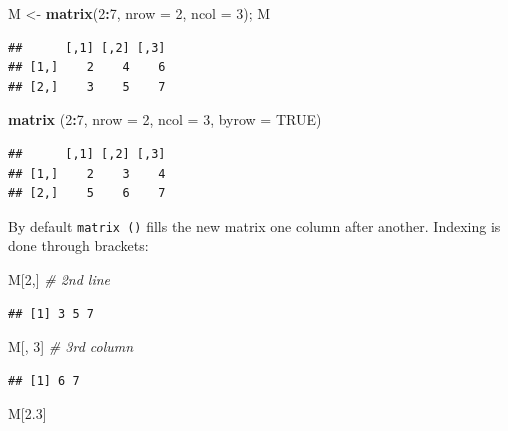 \documentclass[]{book}
\newenvironment{Shaded}{\begin{snugshade}}{\end{snugshade}}
\newcommand{\CommentTok}[1]{\textcolor[rgb]{0.56,0.35,0.01}{\textit{#1}}}
\newcommand{\DataTypeTok}[1]{\textcolor[rgb]{0.13,0.29,0.53}{#1}}
\newcommand{\DecValTok}[1]{\textcolor[rgb]{0.00,0.00,0.81}{#1}}
\newcommand{\FloatTok}[1]{\textcolor[rgb]{0.00,0.00,0.81}{#1}}
\newcommand{\KeywordTok}[1]{\textcolor[rgb]{0.13,0.29,0.53}{\textbf{#1}}}
\newcommand{\NormalTok}[1]{#1}
\newcommand{\OperatorTok}[1]{\textcolor[rgb]{0.81,0.36,0.00}{\textbf{#1}}}
\newcommand{\OtherTok}[1]{\textcolor[rgb]{0.56,0.35,0.01}{#1}}
\newcommand{\StringTok}[1]{\textcolor[rgb]{0.31,0.60,0.02}{#1}}
\begin{document}
\begin{Shaded}
\begin{Highlighting}[]
\NormalTok{M <-}\StringTok{ }\KeywordTok{matrix}\NormalTok{(}\DecValTok{2}\OperatorTok{:}\DecValTok{7}\NormalTok{, }\DataTypeTok{nrow =} \DecValTok{2}\NormalTok{, }\DataTypeTok{ncol =} \DecValTok{3}\NormalTok{); M}
\end{Highlighting}
\end{Shaded}

\begin{verbatim}
##      [,1] [,2] [,3]
## [1,]    2    4    6
## [2,]    3    5    7
\end{verbatim}

\begin{Shaded}
\begin{Highlighting}[]
\KeywordTok{matrix}\NormalTok{ (}\DecValTok{2}\OperatorTok{:}\DecValTok{7}\NormalTok{, }\DataTypeTok{nrow =} \DecValTok{2}\NormalTok{, }\DataTypeTok{ncol =} \DecValTok{3}\NormalTok{, }\DataTypeTok{byrow =} \OtherTok{TRUE}\NormalTok{)}
\end{Highlighting}
\end{Shaded}

\begin{verbatim}
##      [,1] [,2] [,3]
## [1,]    2    3    4
## [2,]    5    6    7
\end{verbatim}

By default \texttt{matrix\ ()} fills the new matrix one column after another. Indexing is done through brackets:

\begin{Shaded}
\begin{Highlighting}[]
\NormalTok{M[}\DecValTok{2}\NormalTok{,] }\CommentTok{# 2nd line}
\end{Highlighting}
\end{Shaded}

\begin{verbatim}
## [1] 3 5 7
\end{verbatim}

\begin{Shaded}
\begin{Highlighting}[]
\NormalTok{M[, }\DecValTok{3}\NormalTok{] }\CommentTok{# 3rd column}
\end{Highlighting}
\end{Shaded}

\begin{verbatim}
## [1] 6 7
\end{verbatim}

\begin{Shaded}
\begin{Highlighting}[]
\NormalTok{M[}\FloatTok{2.3}\NormalTok{]}
\end{Highlighting}
\end{Shaded}
\end{document}

